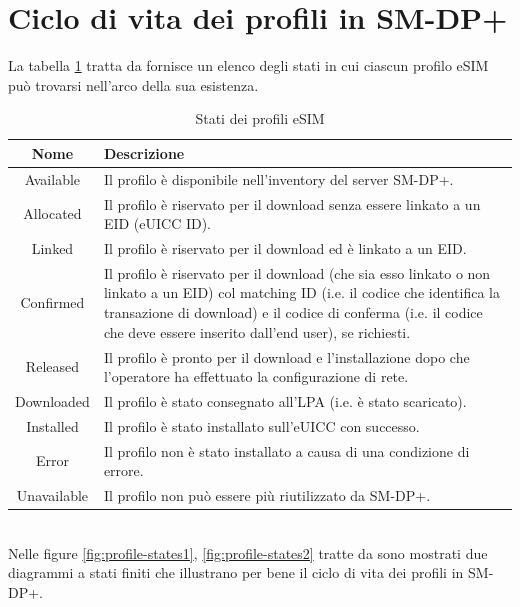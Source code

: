 \documentclass[10pt, twoside, openany]{book}
\begin{document}
\section{Ciclo di vita dei profili in SM-DP+}
La tabella \ref{tab:profile-states} tratta da \cite{GSMA-docs-new}\cite{GSMA-docs-old} fornisce un elenco degli stati in cui ciascun profilo eSIM può trovarsi nell'arco della sua esistenza.
\begin{table}[h!]
\begin{center}
\captionsetup{skip=4pt}
\caption{Stati dei profili eSIM}
\label{tab:profile-states}
\begin{tabularx}{\textwidth}{|c|X|}
\hline
\textbf{Nome} & \textbf{Descrizione}\\
\hline
Available & Il profilo è disponibile nell’inventory del server SM-DP+.\\
\hline
Allocated & Il profilo è riservato per il download senza essere linkato a un EID (eUICC ID).\\
\hline
Linked & Il profilo è riservato per il download ed è linkato a un EID.\\
\hline
Confirmed & Il profilo è riservato per il download (che sia esso linkato o non linkato a un EID) col matching ID (i.e. il codice che identifica la transazione di download) e il codice di conferma (i.e. il codice che deve essere inserito dall'end user), se richiesti.\\
\hline
Released & Il profilo è pronto per il download e l’installazione dopo che l’operatore ha effettuato la configurazione di rete.\\
\hline
Downloaded & Il profilo è stato consegnato all’LPA (i.e. è stato scaricato).\\
\hline
Installed & Il profilo è stato installato sull’eUICC con successo.\\
\hline
Error & Il profilo non è stato installato a causa di una condizione di errore.\\
\hline
Unavailable & Il profilo non può essere più riutilizzato da SM-DP+.\\
\hline
\end{tabularx}
\end{center}
\end{table}
\\Nelle figure \ref{fig:profile-states1}, \ref{fig:profile-states2} tratte da \cite{GSMA-docs-new}\cite{GSMA-docs-old} sono mostrati due diagrammi a stati finiti che illustrano per bene il ciclo di vita dei profili in SM-DP+.
\end{document}
